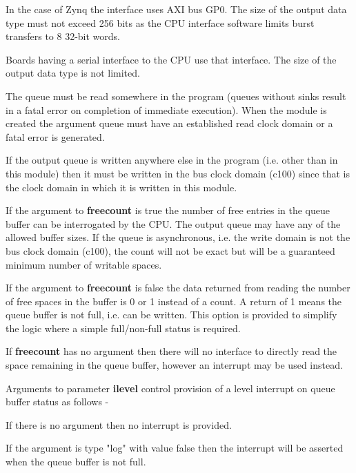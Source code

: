             In the case of Zynq the interface uses AXI bus GP0.            
            The size of the output data type must not exceed 256 bits as the CPU
            interface software limits burst transfers to 8 32-bit words.
            
            Boards having a serial interface to the CPU use that interface.
            The size of the output data type is not limited.

            The queue must be read somewhere in the program (queues without
            sinks result in a fatal error on completion of immediate execution).
            When the module is created the argument queue must have an established
            read clock domain or a fatal error is generated.

            If the output queue is written anywhere else in the program (i.e. other
            than in this module) then it must be written in the bus clock domain
            (c100) since that is the clock domain in which it is written in this
            module.

            If the argument to {\bf freecount} is true the number of free entries in
            the queue buffer can be interrogated by the CPU. The output queue may
            have any of the allowed buffer sizes. If the queue is asynchronous, i.e.
            the write domain is not the bus clock domain (c100), the count will not
            be exact but will be a guaranteed minimum number of writable spaces.

            If the argument to {\bf freecount} is false the data returned from
            reading the number of free spaces in the buffer is 0 or 1 instead of a
            count. A return of 1 means the queue buffer is not full, i.e. can be
            written. This option is provided to simplify the logic where a simple
            full/non-full status is required.

            If {\bf freecount} has no argument then there will no interface to
            directly read the space remaining in the queue buffer, however an
            interrupt may be used instead.            

            Arguments to parameter {\bf ilevel} control provision of a level
            interrupt on queue buffer status as follows -

            If there is no argument then no interrupt is provided.

            If the argument is type "log" with value false then the interrupt will
            be asserted when the queue buffer is not full.

